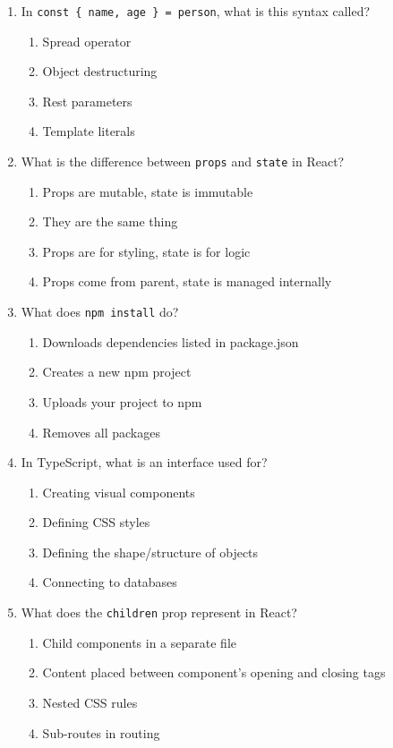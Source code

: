 \documentclass[12pt,a4paper]{article}
\begin{document}
\begin{enumerate}
\item In \texttt{const \{ name, age \} = person}, what is this syntax called?
\begin{enumerate}[label=\Alph*)]
    \item Spread operator
    \item Object destructuring
    \item Rest parameters
    \item Template literals
\end{enumerate}

\item What is the difference between \texttt{props} and \texttt{state} in React?
\begin{enumerate}[label=\Alph*)]
    \item Props are mutable, state is immutable
    \item They are the same thing
    \item Props are for styling, state is for logic
    \item Props come from parent, state is managed internally
\end{enumerate}

\item What does \texttt{npm install} do?
\begin{enumerate}[label=\Alph*)]
    \item Downloads dependencies listed in package.json
    \item Creates a new npm project
    \item Uploads your project to npm
    \item Removes all packages
\end{enumerate}

\item In TypeScript, what is an interface used for?
\begin{enumerate}[label=\Alph*)]
    \item Creating visual components
    \item Defining CSS styles
    \item Defining the shape/structure of objects
    \item Connecting to databases
\end{enumerate}

\item What does the \texttt{children} prop represent in React?
\begin{enumerate}[label=\Alph*)]
    \item Child components in a separate file
    \item Content placed between component's opening and closing tags
    \item Nested CSS rules
    \item Sub-routes in routing
\end{enumerate}


\end{enumerate}
\end{document}
